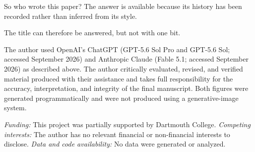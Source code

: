 \documentclass[pdflatex,sn-mathphys-num]{sn-jnl}
\begin{document}
So who wrote this paper? The answer is available because its history has been recorded rather than
inferred from its style.

The title can therefore be answered, but not with one bit.

\clearpage
\backmatter

The author used OpenAI's ChatGPT (GPT-5.6 Sol Pro and GPT-5.6 Sol; accessed 
September 2026) and Anthropic Claude (Fable 5.1; accessed September 2026) as described above. The author 
critically evaluated, revised, and verified material produced with their assistance and takes full responsibility 
for the accuracy, interpretation, and integrity of the final manuscript.  Both figures were generated 
programmatically and were not produced using a generative-image system.

\par

\emph{Funding:} This project was partially supported by Dartmouth College. \emph{Competing interests:} The author has no 
relevant financial or non-financial interests to disclose. \emph{Data and code availability:} No data were generated or analyzed.


\end{document}

